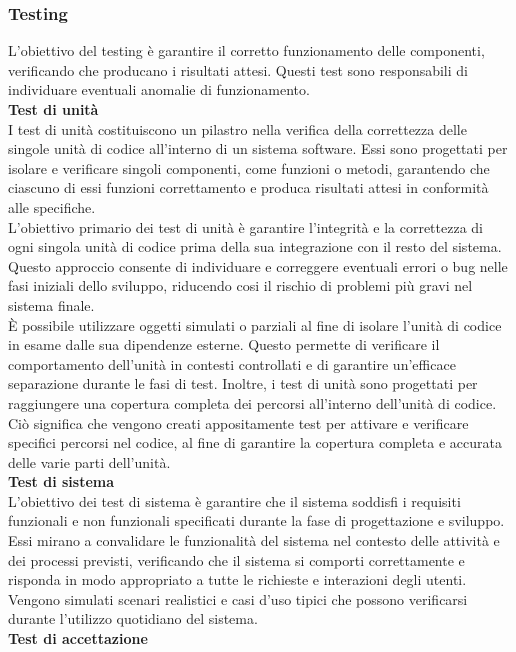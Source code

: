 \documentclass[a4paper,10pt]{article}
\begin{document}
\subsubsection{Testing}
L'obiettivo del testing è garantire il corretto funzionamento delle componenti, verificando che producano i risultati attesi. Questi test sono responsabili di individuare eventuali anomalie di funzionamento. \\
\textbf{Test di unità} \\
I test di unità costituiscono un pilastro nella verifica della correttezza delle singole unità di codice all'interno di un sistema software. Essi sono progettati per isolare e verificare singoli componenti, come funzioni o metodi, garantendo che ciascuno di essi funzioni correttamento e produca risultati attesi in conformità alle specifiche.\\
L'obiettivo primario dei test di unità è garantire l'integrità e la correttezza di ogni singola unità di codice prima della sua integrazione con il resto del sistema. Questo approccio consente di individuare e correggere eventuali errori o bug nelle fasi iniziali dello sviluppo, riducendo cosi il rischio di problemi più gravi nel sistema finale.\\
È possibile utilizzare oggetti simulati o parziali al fine di isolare l'unità di codice in esame dalle sua dipendenze esterne. Questo permette di verificare il comportamento dell'unità in contesti controllati e di garantire un'efficace separazione durante le fasi di test. Inoltre, i test di unità sono progettati per raggiungere una copertura completa dei percorsi all'interno dell'unità di codice. Ciò significa che vengono creati appositamente test per attivare e verificare specifici percorsi nel codice, al fine di garantire la copertura completa e accurata delle varie parti dell'unità. \\
\textbf{Test di sistema} \\
L'obiettivo dei test di sistema è garantire che il sistema soddisfi i requisiti funzionali e non funzionali specificati durante la fase di progettazione e sviluppo. Essi mirano a convalidare le funzionalità del sistema nel contesto delle attività e dei processi previsti, verificando che il sistema si comporti correttamente e risponda in modo appropriato a tutte le richieste e interazioni degli utenti. \\
Vengono simulati scenari realistici e casi d'uso tipici che possono verificarsi durante l'utilizzo quotidiano del sistema.\\
\textbf{Test di accettazione}
\end{document}
